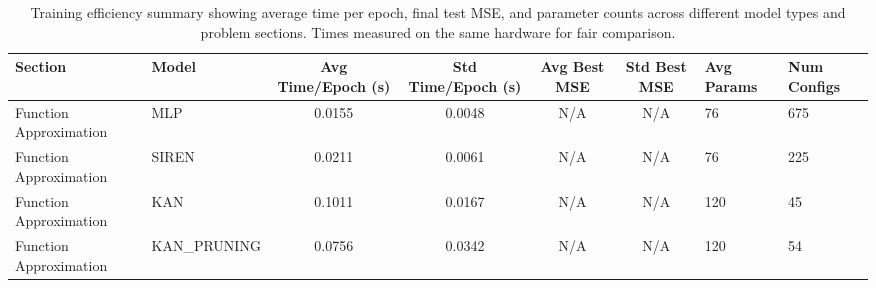 \begin{table}
\caption{Training efficiency summary showing average time per epoch, final test MSE, and parameter counts across different model types and problem sections. Times measured on the same hardware for fair comparison.}
\label{tab:convergence_summary}
\begin{tabular}{|l|l|c|c|c|c|}
\toprule
Section & Model & Avg Time/Epoch (s) & Std Time/Epoch (s) & Avg Best MSE & Std Best MSE & Avg Params & Num Configs \\
\midrule
Function Approximation & MLP & 0.0155 & 0.0048 & N/A & N/A & 76 & 675 \\
Function Approximation & SIREN & 0.0211 & 0.0061 & N/A & N/A & 76 & 225 \\
Function Approximation & KAN & 0.1011 & 0.0167 & N/A & N/A & 120 & 45 \\
Function Approximation & KAN_PRUNING & 0.0756 & 0.0342 & N/A & N/A & 120 & 54 \\
\bottomrule
\end{tabular}
\end{table}
